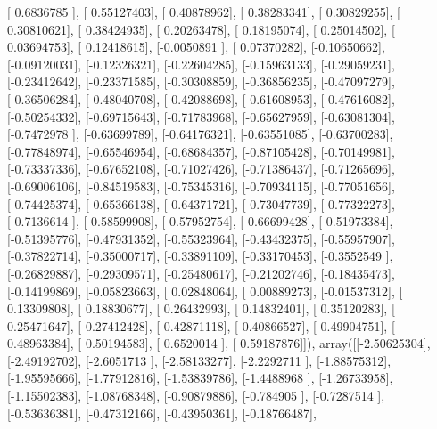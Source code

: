 \documentclass{article}
\begin{document}
       [ 0.6836785 ],
       [ 0.55127403],
       [ 0.40878962],
       [ 0.38283341],
       [ 0.30829255],
       [ 0.30810621],
       [ 0.38424935],
       [ 0.20263478],
       [ 0.18195074],
       [ 0.25014502],
       [ 0.03694753],
       [ 0.12418615],
       [-0.0050891 ],
       [ 0.07370282],
       [-0.10650662],
       [-0.09120031],
       [-0.12326321],
       [-0.22604285],
       [-0.15963133],
       [-0.29059231],
       [-0.23412642],
       [-0.23371585],
       [-0.30308859],
       [-0.36856235],
       [-0.47097279],
       [-0.36506284],
       [-0.48040708],
       [-0.42088698],
       [-0.61608953],
       [-0.47616082],
       [-0.50254332],
       [-0.69715643],
       [-0.71783968],
       [-0.65627959],
       [-0.63081304],
       [-0.7472978 ],
       [-0.63699789],
       [-0.64176321],
       [-0.63551085],
       [-0.63700283],
       [-0.77848974],
       [-0.65546954],
       [-0.68684357],
       [-0.87105428],
       [-0.70149981],
       [-0.73337336],
       [-0.67652108],
       [-0.71027426],
       [-0.71386437],
       [-0.71265696],
       [-0.69006106],
       [-0.84519583],
       [-0.75345316],
       [-0.70934115],
       [-0.77051656],
       [-0.74425374],
       [-0.65366138],
       [-0.64371721],
       [-0.73047739],
       [-0.77322273],
       [-0.7136614 ],
       [-0.58599908],
       [-0.57952754],
       [-0.66699428],
       [-0.51973384],
       [-0.51395776],
       [-0.47931352],
       [-0.55323964],
       [-0.43432375],
       [-0.55957907],
       [-0.37822714],
       [-0.35000717],
       [-0.33891109],
       [-0.33170453],
       [-0.3552549 ],
       [-0.26829887],
       [-0.29309571],
       [-0.25480617],
       [-0.21202746],
       [-0.18435473],
       [-0.14199869],
       [-0.05823663],
       [ 0.02848064],
       [ 0.00889273],
       [-0.01537312],
       [ 0.13309808],
       [ 0.18830677],
       [ 0.26432993],
       [ 0.14832401],
       [ 0.35120283],
       [ 0.25471647],
       [ 0.27412428],
       [ 0.42871118],
       [ 0.40866527],
       [ 0.49904751],
       [ 0.48963384],
       [ 0.50194583],
       [ 0.6520014 ],
       [ 0.59187876]]), array([[-2.50625304],
       [-2.49192702],
       [-2.6051713 ],
       [-2.58133277],
       [-2.2292711 ],
       [-1.88575312],
       [-1.95595666],
       [-1.77912816],
       [-1.53839786],
       [-1.4488968 ],
       [-1.26733958],
       [-1.15502383],
       [-1.08768348],
       [-0.90879886],
       [-0.784905  ],
       [-0.7287514 ],
       [-0.53636381],
       [-0.47312166],
       [-0.43950361],
       [-0.18766487],
\end{document}
